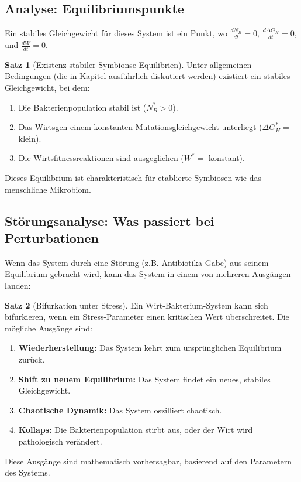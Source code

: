 \documentclass[a4paper,12pt]{article}
\theoremstyle{definition}
\newtheorem{satz}{Satz}
\begin{document}
\subsection{Analyse: Equilibriumspunkte}

Ein stabiles Gleichgewicht für dieses System ist ein Punkt, wo $\frac{dN_B}{dt} = 0$, $\frac{d\Delta G_H}{dt} = 0$, und $\frac{dW}{dt} = 0$.

\begin{satz}[Existenz stabiler Symbionse-Equilibrien]
Unter allgemeinen Bedingungen (die in Kapitel ausführlich diskutiert werden) existiert ein stabiles Gleichgewicht, bei dem:
\begin{enumerate}
    \item Die Bakterienpopulation stabil ist ($N_B^* > 0$).
    \item Das Wirtsgen einem konstanten Mutationsgleichgewicht unterliegt ($\Delta G_H^* = $ klein).
    \item Die Wirtsfitnessreaktionen sind ausgeglichen ($W^* = $ konstant).
\end{enumerate}

Dieses Equilibrium ist charakteristisch für etablierte Symbiosen wie das menschliche Mikrobiom.
\end{satz}

\subsection{Störungsanalyse: Was passiert bei Perturbationen}

Wenn das System durch eine Störung (z.B. Antibiotika-Gabe) aus seinem Equilibrium gebracht wird, kann das System in einem von mehreren Ausgängen landen:

\begin{satz}[Bifurkation unter Stress]
Ein Wirt-Bakterium-System kann sich bifurkieren, wenn ein Stress-Parameter einen kritischen Wert überschreitet. Die mögliche Ausgänge sind:
\begin{enumerate}
    \item \textbf{Wiederherstellung:} Das System kehrt zum ursprünglichen Equilibrium zurück.
    \item \textbf{Shift zu neuem Equilibrium:} Das System findet ein neues, stabiles Gleichgewicht.
    \item \textbf{Chaotische Dynamik:} Das System oszilliert chaotisch.
    \item \textbf{Kollaps:} Die Bakterienpopulation stirbt aus, oder der Wirt wird pathologisch verändert.
\end{enumerate}

Diese Ausgänge sind mathematisch vorhersagbar, basierend auf den Parametern des Systems.
\end{satz}
\end{document}

